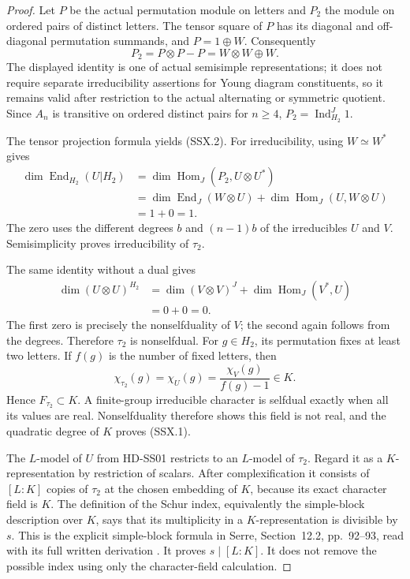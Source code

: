 \begin{proof}
Let $P$ be the actual permutation module on letters and $P_2$
the module on ordered pairs of distinct letters.  The tensor square
of $P$ has its diagonal and off-diagonal permutation summands,
and $P=1\oplus W$.  Consequently
\[
        P_2=P\otimes P-P=W\otimes W\oplus W.
 \tag{SSX.3}
\]
The displayed identity is one of actual semisimple representations;
it does not require separate irreducibility assertions for Young
diagram constituents, so it remains valid after restriction to
the actual alternating or symmetric quotient.
Since $A_n$ is transitive on ordered distinct pairs for $n\ge4$,
$P_2=\operatorname{Ind}_{H_2}^J1$.

The tensor projection formula yields (SSX.2).  For irreducibility,
using $W\simeq W^*$ gives
\[
 \begin{split}
 \dim\operatorname{End}_{H_2}(U|H_2)
  &=\dim\operatorname{Hom}_J(P_2,U\otimes U^*)\\
  &=\dim\operatorname{End}_J(W\otimes U)
       +\dim\operatorname{Hom}_J(U,W\otimes U)\\
  &=1+0=1.
 \end{split}
 \tag{SSX.4}
\]
The zero uses the different degrees $b$ and $(n-1)b$ of the
irreducibles $U$ and $V$.  Semisimplicity proves irreducibility
of $\tau_2$.

The same identity without a dual gives
\[
 \begin{split}
 \dim(U\otimes U)^{H_2}
   &=\dim(V\otimes V)^J
        +\dim\operatorname{Hom}_J(V^*,U)\\
   &=0+0=0.
 \end{split}
 \tag{SSX.5}
\]
The first zero is precisely the nonselfduality of $V$; the second
again follows from the degrees.  Therefore $\tau_2$ is nonselfdual.
For $g\in H_2$, its permutation fixes at least two letters.  If
$f(g)$ is the number of fixed letters, then
\[
              \chi_{\tau_2}(g)=\chi_U(g)
                    =\frac{\chi_V(g)}{f(g)-1}\in K.
 \tag{SSX.6}
\]
Hence $F_{\tau_2}\subset K$.  A finite-group irreducible character
is selfdual exactly when all its values are real.  Nonselfduality
therefore shows this field is not real, and the quadratic degree
of $K$ proves (SSX.1).

The $L$-model of $U$ from HD-SS01 restricts to an $L$-model of
$\tau_2$.  Regard it as a $K$-representation by restriction of
scalars.  After complexification it consists of $[L:K]$ copies
of $\tau_2$ at the chosen embedding of $K$, because its exact
character field is $K$.  The definition of the Schur index,
equivalently the simple-block description over $K$, says that
its multiplicity in a $K$-representation is divisible by $s$.
This is the explicit simple-block formula in Serre, Section~12.2,
pp.~92--93, read with its full written derivation
\cite{OG:Serre1977}.  It proves $s\mid[L:K]$.  It does not remove
the possible index using only the character-field calculation.


\end{proof}
